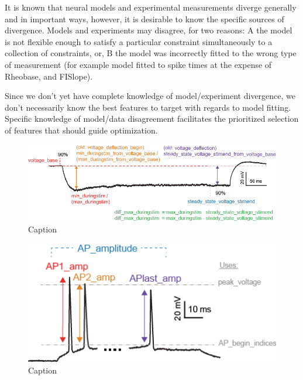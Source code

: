 It is known that neural models and experimental measurements diverge generally and in important ways, however, it is desirable to know the specific sources of divergence. Models and experiments may disagree, for two reasons: A the model is not flexible enough to satisfy a particular constraint simultaneously to a collection of constraints, or, B the model was incorrectly fitted to the wrong type of measurement (for example model fitted to spike times at the expense of Rheobase, and FISlope). 

Since we don't yet have complete knowledge of model/experiment divergence, we don't necessarily know the best features to target with regards to model fitting. Specific knowledge of model/data disagreement facilitates the prioritized selection of features that should guide optimization. 



\begin{figure}
    \centering
    \includegraphics{figures/voltage_features.png}
    \caption{Caption}
    \label{fig:voltage_figures}
\end{figure}
\begin{figure}
    \centering
    \includegraphics{figures/AP_Amplitude.png}
    \caption{Caption}
    \label{fig:features_example}
\end{figure}

